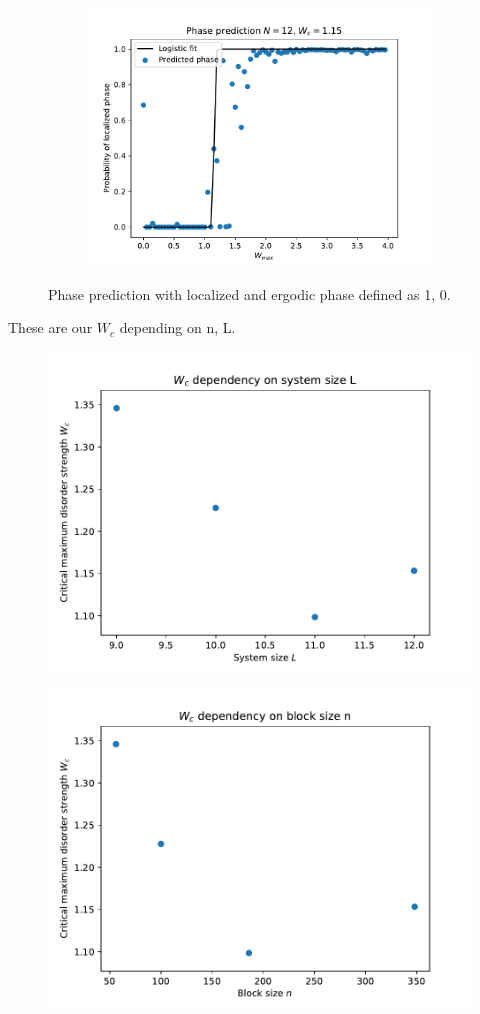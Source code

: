 \documentclass[reprint,amsmath,amssymb,aps,prb]{revtex4-2}
\begin{document}
\begin{figure}[h!]
\begin{subfigure}[c]{0.3\textwidth}
		\includegraphics[width=\textwidth]{../results/N12_predict_wc}
		\label{fig:N12_predict_wc}
	\end{subfigure}
	\caption{Phase prediction with localized and ergodic phase defined as 1, 0.}
\end{figure}


These are our $W_c$ depending on n, L.


\begin{figure}
	\centering
	\includegraphics[width=0.7\linewidth]{../results/Wc_L_dependency}
	\caption{}
	\label{fig:Wc_L_dependency}
\end{figure}
\begin{figure}
\centering
\includegraphics[width=0.7\linewidth]{../results/Wc_N_dependency}
\caption{}
\label{fig:Wc_N_dependency}
\end{figure}
\end{document}
